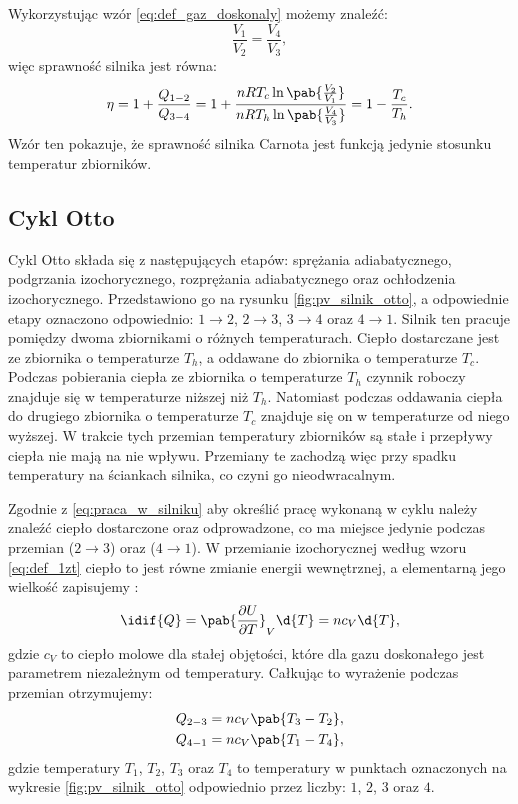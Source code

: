 Wykorzystując wzór \eqref{eq:def_gaz_doskonaly} możemy znaleźć:
\begin{equation*}
	\frac{V_1}{V_2} = \frac{V_4}{V_3},
\end{equation*}
więc sprawność silnika jest równa:
\begin{equation}\label{eq:sprawnosc_silnika_Carnota}
	\eta = 1 + \frac{Q_{1-2}}{Q_{3-4}} =
	1 + \frac{nRT_c \ln\pab{\frac{V_2}{V_1}}}{nRT_h \ln\pab{\frac{V_4}{V_3}}} =
	1 - \frac{T_c}{T_h}.
\end{equation}
Wzór ten pokazuje, że sprawność silnika Carnota jest funkcją jedynie stosunku temperatur zbiorników.

\subsection{Cykl Otto}\label{ssec:cykl_otto}
Cykl Otto składa się z następujących etapów: sprężania adiabatycznego, podgrzania izochorycznego, rozprężania adiabatycznego oraz ochłodzenia izochorycznego. Przedstawiono go na rysunku \ref{fig:pv_silnik_otto}, a odpowiednie etapy oznaczono odpowiednio: \(1 \rightarrow 2\), \(2 \rightarrow 3\), \(3 \rightarrow 4\) oraz \(4 \rightarrow 1\). Silnik ten pracuje pomiędzy dwoma zbiornikami o różnych temperaturach. Ciepło dostarczane jest ze zbiornika o temperaturze \(T_h\), a oddawane do zbiornika o temperaturze \(T_c\). Podczas pobierania ciepła ze zbiornika o temperaturze \(T_h\) czynnik roboczy znajduje się w temperaturze niższej niż \(T_h\). Natomiast podczas oddawania ciepła do drugiego zbiornika o temperaturze \(T_c\) znajduje się on w temperaturze od niego wyższej. W trakcie tych przemian temperatury zbiorników są stałe i przepływy ciepła nie mają na nie wpływu. Przemiany te zachodzą więc przy spadku temperatury na ściankach silnika, co czyni go nieodwracalnym.

Zgodnie z \eqref{eq:praca_w_silniku} aby określić pracę wykonaną w cyklu należy znaleźć ciepło dostarczone oraz odprowadzone, co ma miejsce jedynie podczas przemian (\(2 \rightarrow 3\)) oraz (\(4 \rightarrow 1\)). W przemianie izochorycznej według wzoru \eqref{eq:def_1zt} ciepło to jest równe zmianie energii wewnętrznej, a elementarną jego wielkość zapisujemy \cite{b:pudlik_termodynamika}:
\begin{equation}
	\idif{Q} = \pab{\pdv{U}{T}}_{V} \d{T} = n c_{V} \d{T},
\end{equation}
gdzie \(c_{V}\) to ciepło molowe dla stałej objętości, które dla gazu doskonałego jest parametrem niezależnym od temperatury. Całkując to wyrażenie podczas przemian otrzymujemy:
\begin{equation}\label{eq:otto_Q}
\begin{split}
	Q_{2-3} = n c_{V} \pab{T_3 - T_2}, \\
	Q_{4-1} = n c_{V} \pab{T_1 - T_4},
\end{split}
\end{equation}
gdzie temperatury \(T_1\), \(T_2\), \(T_3\) oraz \(T_4\) to temperatury w punktach oznaczonych na wykresie \ref{fig:pv_silnik_otto} odpowiednio przez liczby: \(1\), \(2\), \(3\) oraz \(4\).

